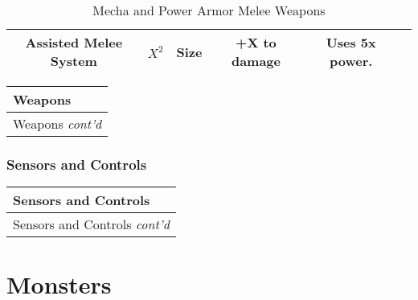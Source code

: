 \documentclass[twoside]{book}
\begin{document}
\begin{table}[htb]
\begin{center}
\begin{tabular}{|c|c|c|c|c|c|}
\hline

 Assisted Melee System &  \begin{math}
                      {X}^{ 2 }\end{math}  
                  & Size & +X to damage & Uses 5x power. \\

\hline


  \end{tabular}
  
\caption{Mecha and Power Armor Melee Weapons}
  
  \end{center}
\end{table}
  
\begin{longtable}{p{1.25in}} 
  Weapons
  \\
  \hline
  \hline
  \endfirsthead
  Weapons \textit{cont'd}
        
  \\
  \hline
  \endhead
      
\end{longtable}
    
\begin{multicols}{2}
    
\end{multicols}
  
    

\subsection{Sensors and Controls}
    
\begin{longtable}{p{1.25in}} 
  Sensors and Controls
  \\
  \hline
  \hline
  \endfirsthead
  Sensors and Controls \textit{cont'd}
        
  \\
  \hline
  \endhead
      
\end{longtable}
    
\begin{multicols}{2}
    
\end{multicols}
  
    

\chapter{Monsters}
    
\end{document}
